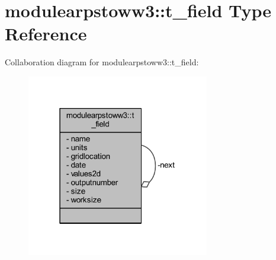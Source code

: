 \hypertarget{structmodulearpstoww3_1_1t__field}{}\section{modulearpstoww3\+:\+:t\+\_\+field Type Reference}
\label{structmodulearpstoww3_1_1t__field}


Collaboration diagram for modulearpstoww3\+:\+:t\+\_\+field\+:\nopagebreak
\begin{figure}[H]
\begin{center}
\leavevmode
\includegraphics[width=226pt]{structmodulearpstoww3_1_1t__field__coll__graph}
\end{center}
\end{figure}
